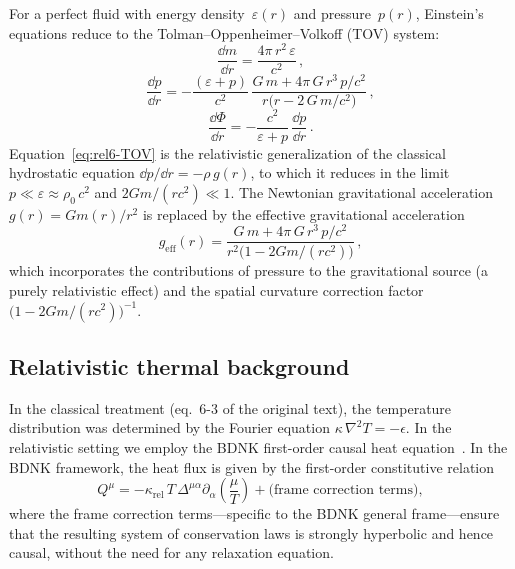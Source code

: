 For a perfect fluid with energy density~$\varepsilon(r)$ and
pressure~$p(r)$, Einstein's equations reduce to the
Tolman--Oppenheimer--Volkoff (TOV) system:
\begin{equation}
  \frac{\dd m}{\dd r}
  = \frac{4\pi\,r^{2}\,\varepsilon}{c^{2}} \,,
  \label{eq:rel6-mass}
\end{equation}
\begin{equation}
  \frac{\dd p}{\dd r}
  = -\frac{(\varepsilon + p)}{c^{2}}
    \,\frac{G\,m + 4\pi\,G\,r^{3}\,p/c^{2}}
          {r\bigl(r - 2\,G\,m/c^{2}\bigr)} \,,
  \label{eq:rel6-TOV}
\end{equation}
\begin{equation}
  \frac{\dd\Phi}{\dd r}
  = -\frac{c^{2}}{\varepsilon + p}\,\frac{\dd p}{\dd r} \,.
  \label{eq:rel6-Phi}
\end{equation}
Equation~\eqref{eq:rel6-TOV} is the relativistic generalization of the
classical hydrostatic equation $\dd p/\dd r = -\rho\,g(r)$, to which it
reduces in the limit $p \ll \varepsilon \approx \rho_{0}\,c^{2}$ and
$2Gm/(rc^{2}) \ll 1$.  The Newtonian gravitational acceleration
$g(r) = Gm(r)/r^{2}$ is replaced by the effective gravitational
acceleration
\begin{equation}
  g_{\mathrm{eff}}(r)
  = \frac{G\,m + 4\pi\,G\,r^{3}\,p/c^{2}}
        {r^{2}\bigl(1 - 2Gm/(rc^{2})\bigr)} \,,
  \label{eq:rel6-geff}
\end{equation}
which incorporates the contributions of pressure to the gravitational
source (a purely relativistic effect) and the spatial curvature
correction factor $\bigl(1 - 2Gm/(rc^{2})\bigr)^{-1}$.

\subsection{Relativistic thermal background}
\label{subsec:rel-56-thermal}

In the classical treatment (eq.~6-3 of the original text), the
temperature distribution was determined by the Fourier equation
$\kappa\,\nabla^{2}T = -\epsilon$.  In the relativistic setting
we employ the BDNK first-order causal heat
equation~\cite{BemficaDN2018,Kovtun2019}.  In the BDNK framework, the
heat flux is given by the first-order constitutive relation
\begin{equation}
  Q^{\mu} = -\kappa_{\mathrm{rel}}\,T\,\Delta^{\mu\alpha}
    \partial_{\alpha}\!\left(\frac{\mu}{T}\right)
    + \text{(frame correction terms)},
  \label{eq:rel6-BDNK-heat}
\end{equation}
where the frame correction terms---specific to the BDNK general
frame---ensure that the resulting system of conservation laws is
strongly hyperbolic and hence causal, without the need for any
relaxation equation.

